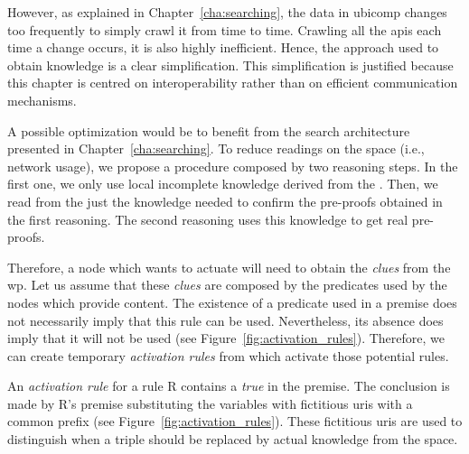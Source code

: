 However, as explained in Chapter~\ref{cha:searching}, the data in \ac{ubicomp} changes too frequently to simply crawl it from time to time.
Crawling all the \acsp{api} each time a change occurs, it is also highly inefficient.
Hence, the approach used to obtain knowledge is a clear simplification.
This simplification is justified because this chapter is centred on interoperability rather than on efficient communication mechanisms.


\bigskip


A possible optimization would be to benefit from the search architecture presented in Chapter~\ref{cha:searching}.
To reduce readings on the space (i.e., network usage), we propose a procedure composed by two reasoning steps.
In the first one, we only use local incomplete knowledge derived from the \clues{}.
Then, we read from the \Space{} just the knowledge needed to confirm the pre-proofs obtained in the first reasoning.
The second reasoning uses this knowledge to get real pre-proofs. %


Therefore, a node which wants to actuate will need to obtain the \emph{clues} from the \ac{wp}.
Let us assume that these \emph{clues} are composed by the predicates used by the nodes which provide content. %
The existence of a predicate used in a premise does not necessarily imply that this rule can be used.
Nevertheless, its absence does imply that it will not be used (see Figure~\ref{fig:activation_rules}).
Therefore, we can create temporary \emph{activation rules} from \clues{} which activate those potential rules. %




An \emph{activation rule} for a rule R contains a \emph{true} in the premise.
The conclusion is made by R's premise substituting the variables with fictitious \acsp{uri} with a common prefix (see Figure~\ref{fig:activation_rules}).
These fictitious \acsp{uri} are used to distinguish when a triple should be replaced by actual knowledge from the space. %




